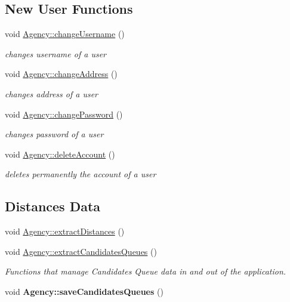 \subsection*{New User Functions}
\begin{DoxyCompactItemize}
\item 
void \hyperlink{group___agency_ga8a2b0d746484213d43f722c0a0766a66}{Agency\+::change\+Username} ()
\begin{DoxyCompactList}\small\item\em changes username of a user \end{DoxyCompactList}\item 
\mbox{\label{group___agency_ga9902ae22a9a351479e2b017bc7d32d37}} 
void \hyperlink{group___agency_ga9902ae22a9a351479e2b017bc7d32d37}{Agency\+::change\+Address} ()
\begin{DoxyCompactList}\small\item\em changes address of a user \end{DoxyCompactList}\item 
\mbox{\label{group___agency_ga580f891506db1463b17f1076ccadfe4c}} 
void \hyperlink{group___agency_ga580f891506db1463b17f1076ccadfe4c}{Agency\+::change\+Password} ()
\begin{DoxyCompactList}\small\item\em changes password of a user \end{DoxyCompactList}\item 
\mbox{\label{group___agency_ga90711f8b569ac19ce052b59e79848df5}} 
void \hyperlink{group___agency_ga90711f8b569ac19ce052b59e79848df5}{Agency\+::delete\+Account} ()
\begin{DoxyCompactList}\small\item\em deletes permanently the account of a user \end{DoxyCompactList}\end{DoxyCompactItemize}
\subsection*{Distances Data}
\begin{DoxyCompactItemize}
\item 
void \hyperlink{group___agency_gab893f05c69379631019010af71052595}{Agency\+::extract\+Distances} ()
\item 
\mbox{\label{group___agency_gaf587ae52b7b80696bbc7bba02b8238af}} 
void \hyperlink{group___agency_gaf587ae52b7b80696bbc7bba02b8238af}{Agency\+::extract\+Candidates\+Queues} ()
\begin{DoxyCompactList}\small\item\em Functions that manage Candidates Queue data in and out of the application. \end{DoxyCompactList}\item 
\mbox{\label{group___agency_ga75cbaedb476597df320ed4e53b278f84}} 
void {\bfseries Agency\+::save\+Candidates\+Queues} ()
\end{DoxyCompactItemize}
